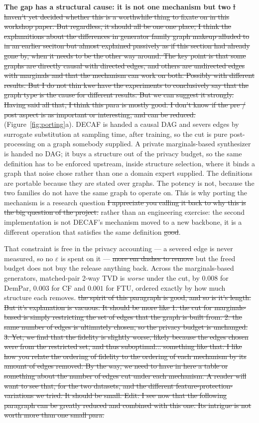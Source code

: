\documentclass{article}
\begin{document}
{{\textbf{The gap has a structural cause: it is not one mechanism but two} \st{I haven't yet decided whether this is a worthwhile thing to fixate on in this workshop paper. But regardless, it should all be one one place; I think the explanaitions about the differences in generator family graph makeup alluded to in an earlier seciton but almost explained passively as if this section had already gone by, when it needs to be the other way around. The key point is that some graphs are directly causal with directed edges, and others are undirected edges with marginals and that the mechanism can work on both. Possibly with different results. But I do not thin kwe have the experiments to conclusively say that the graph type is the cause for different results. But we can suggest it strongly. Having said all that, I think this para is mostly good. I don't know if the pre / post aspect is as important or interesting, and can be reduced.}
(Figure~\ref{fig:porting}a). DECAF is handed a causal DAG and severs edges by
surrogate substitution at sampling time, after training, so the cut is pure
post-processing on a graph somebody supplied. A private marginals-based
synthesizer is handed no DAG; it buys a structure out of the privacy budget, so
the same definition has to be enforced upstream, inside structure selection, where
it binds a graph that noise chose rather than one a domain expert supplied. The
definitions are portable because they are stated over graphs. The potency is not,
because the two families do not have the same graph to operate on. This is why
porting the mechanism is a research question \st{I appreciate you calling it back to why this is the big question of the project.} rather than an engineering exercise:
the second implementation is not DECAF's mechanism moved to a new backbone, it is
a different operation that satisfies the same definition \st{good}.

That constraint is free in the privacy accounting --- a severed edge is never
measured, so no $\varepsilon$ is spent on it --- \st{more em dashes to remove} but the freed budget does not buy
the release anything back. Across the marginals-based generators, matched-pair
2-way TVD is \emph{worse} under the cut, by $0.008$ for DemPar, $0.003$ for CF and
$0.001$ for FTU, ordered exactly by how much structure each removes. \st{the spirit of this paragraph is good, and so is it's length. But it's explanation is vacuous. It should be more like 1. the cut for marginals-based is simply restricting the set of edges that the graph is built from. 2. the same number of edges is ultimately chosen, so the privacy budget is unchanged. 3. Yet, we find that the fidelity is slightly worse, likely because the edges chosen were from the restricted set, and thus suboptimal... something like that. I like how you relate the ordering of fidelity to the ordering of each mechanism by its amount of edges removed. By the way, we need to have in here a table or something about the number of edges cut under each mechanism. A reader will want to see that, for the two datasets, and the different feature-protection-variations we tried. It should be small. Edit: I see now that the following paragraph can be greatly reduced and combined with this one. Its intrigue is not worth more than one small para.} 

}}
\end{document}
